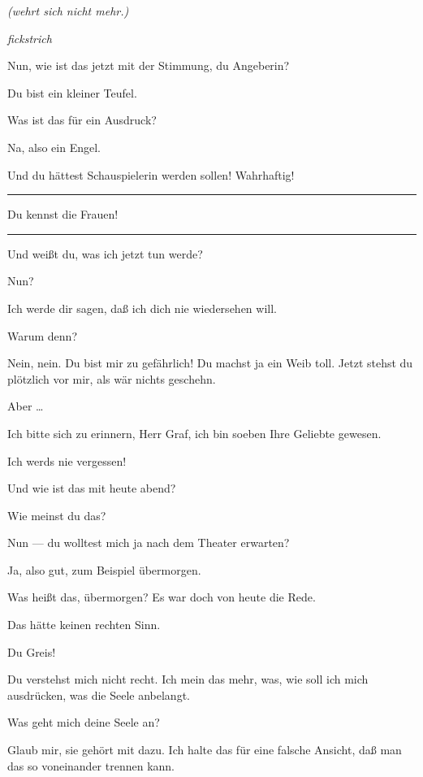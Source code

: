 \documentclass[
	final,
	a4paper,
	ngerman,
	mpinclude = true, %
	twoside = true,
	open = right,
	cleardoublepage = plain,
	DIV = 13,
	BCOR = 1cm,
	titlepage = firstiscover,
	]{scrbook}
\newcommand{\direction}[1]{\textit{(#1)}}
\newcommand{\hiat}{%
	\begin{center}
		\tiny
		\raisebox{0.5ex}{\rule{0.3\linewidth}{0.4pt}}
		\textit{fickstrich}
		\raisebox{0.5ex}{\rule{0.3\linewidth}{0.4pt}}
	\end{center}
}
\newenvironment{deletion}{%
		\vspace{0.25\baselineskip}
		\hrule
		\vspace{0.25\baselineskip}
		\color{darkgray}
	}{
		\color{black}
		\vspace{0.25\baselineskip}
		\hrule 
		\vspace{0.25\baselineskip}
	}
\newcommand{\thecharacter}[1]{\textup{\textsc{#1}}\xspace}
\newcommand{\theschauspielerin}{\thecharacter{Schauspielerin}}
\newcommand{\thegraf}{\thecharacter{Entrepeneurin}}
\newcommand{\character}[1]{\item[#1:]}
\newcommand{\schauspielerin}{\character{\theschauspielerin}}
\newcommand{\entrepeneurin}{\character{\thegraf}}
\begin{document}
\begin{play}
	\entrepeneurin
	\direction{wehrt sich nicht mehr.}

	\hiat

	\schauspielerin
	Nun, wie ist das jetzt mit der Stimmung, du Angeberin?

	\entrepeneurin
	Du bist ein kleiner Teufel.

	\schauspielerin
	Was ist das für ein Ausdruck?

	\entrepeneurin
	Na, also ein Engel.

	\schauspielerin
	Und du hättest Schauspielerin werden sollen! Wahrhaftig!
	\begin{deletion}
		Du kennst die Frauen!
	\end{deletion}
	Und weißt du, was ich jetzt tun werde?

	\entrepeneurin
	Nun?

	\schauspielerin
	Ich werde dir sagen, daß ich dich nie wiedersehen will.

	\entrepeneurin
	Warum denn?

	\schauspielerin
	Nein, nein. Du bist mir zu gefährlich! Du machst ja ein Weib toll. Jetzt stehst du plötzlich vor mir, als wär nichts geschehn.

	\entrepeneurin
	Aber \ldots{}

	\schauspielerin
	Ich bitte sich zu erinnern, Herr Graf, ich bin soeben Ihre Geliebte gewesen.

	\entrepeneurin
	Ich werds nie vergessen!

	\schauspielerin
	Und wie ist das mit heute abend?

	\entrepeneurin
	Wie meinst du das?

	\schauspielerin
	Nun --- du wolltest mich ja nach dem Theater erwarten?

	\entrepeneurin
	Ja, also gut, zum Beispiel übermorgen.

	\schauspielerin
	Was heißt das, übermorgen? Es war doch von heute die Rede.

	\entrepeneurin
	Das hätte keinen rechten Sinn.

	\schauspielerin
	Du Greis!

	\entrepeneurin
	Du verstehst mich nicht recht. Ich mein das mehr, was, wie soll ich mich ausdrücken, was die Seele anbelangt.

	\schauspielerin
	Was geht mich deine Seele an?

	\entrepeneurin
	Glaub mir, sie gehört mit dazu. Ich halte das für eine falsche Ansicht, daß man das so voneinander trennen kann.


\end{play}
\end{document}
